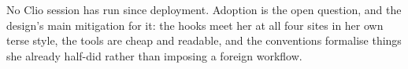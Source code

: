 \documentclass[11pt,a4paper]{article}
\begin{document}
No Clio session has run since deployment. Adoption is the open question, and
the design's main mitigation for it: the hooks meet her at all four sites in
her own terse style, the tools are cheap and readable, and the conventions
formalise things she already half-did rather than imposing a foreign
workflow.
\end{document}
